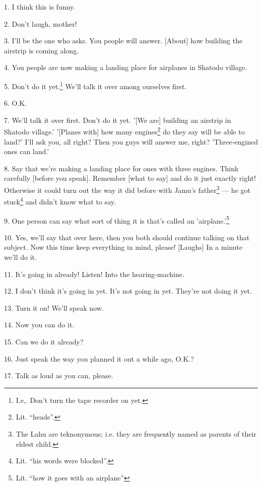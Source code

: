 \setcounter{footnote}{0}

1. I think this is funny.

2. Don't laugh, mother!

3. I'll be the one who asks. You people will answer. [About] how building the airstrip
is coming along.

4. You people are now making a landing place for airplanes in Shatodo village.

5. Don't do it yet.\footnote{I.e,. Don't turn the tape recorder on yet.} We'll talk it over among ourselves first.

6. O.K.

7. We'll talk it over first. Don't do it yet. '[We are] building an airstrip in
Shatodo village.' '[Planes with] how many engines\footnote{Lit. ``heads''.} do they say will be able to
land?' I'll ask you, all right? Then you guys will answer me, right? 'Three-engined
ones can land.'

8. Say that we're making a landing place for ones with three engines. Think carefully
[before you speak]. Remember [what to say] and do it just exactly right! Otherwise
it could turn out the way it did before with Jamu's father\footnote{The Lahu are teknonymous; i.e. they are frequently named as parents of their eldest child.} --- he got stuck\footnote{Lit. ``his words were blocked''.}
and didn't know what to say.

9. One person can say what sort of thing it is that's called an 'airplane.'\footnote{Lit. ``how it goes with an airplane''}

10. Yes, we'll say that over here, then you both should continue talking on that
subject. Now this time keep everything in mind, please! [Laughs] In a minute we'll
do it.

11. It's going in already! Listen! Into the hearing-machine.

12. I don't think it's going in yet. It's not going in yet. They're not doing it
yet.

13. Turn it on! We'll speak now.

14. Now you can do it.

15. Can we do it already?

16. Just speak the way you planned it out a while ago, O.K.?

17. Talk as loud as you can, please.

